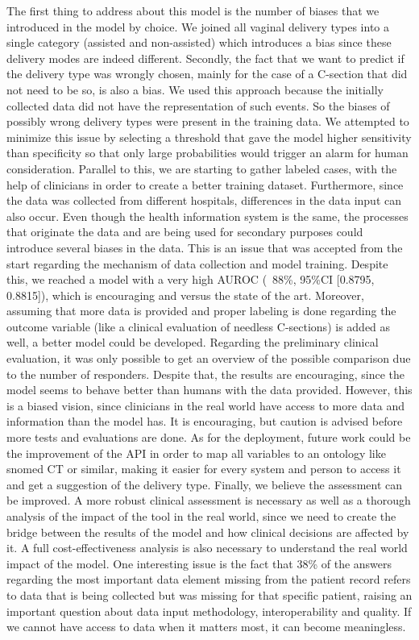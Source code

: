 The first thing to address about this model is the number of biases that we introduced in the model by choice. We joined all vaginal delivery types into a single category (assisted and non-assisted) which introduces a bias since these delivery modes are indeed different. Secondly, the fact that we want to predict if the delivery type was wrongly chosen, mainly for the case of a C-section that did not need to be so, is also a bias. We used this approach because the initially collected data did not have the representation of such events. So the biases of possibly wrong delivery types were present in the training data. We attempted to minimize this issue by selecting a threshold that gave the model higher sensitivity than specificity so that only large probabilities would trigger an alarm for human consideration. Parallel to this, we are starting to gather labeled cases, with the help of clinicians in order to create a better training dataset. Furthermore, since the data was collected from different hospitals, differences in the data input can also occur. Even though the health information system is the same, the processes that originate the data and are being used for secondary purposes could introduce several biases in the data. This is an issue that was accepted from the start regarding the mechanism of data collection and model training. Despite this, we reached a model with a very high AUROC ( 88\%, 95\%CI [0.8795, 0.8815]), which is encouraging and versus the state of the art. Moreover, assuming that more data is provided and proper labeling is done regarding the outcome variable (like a clinical evaluation of needless C-sections) is added as well, a better model could be developed. Regarding the preliminary clinical evaluation, it was only possible to get an overview of the possible comparison due to the number of responders. Despite that, the results are encouraging, since the model seems to behave better than humans with the data provided. However, this is a biased vision, since clinicians in the real world have access to more data and information than the model has. It is encouraging, but caution is advised before more tests and evaluations are done. As for the deployment, future work could be the improvement of the API in order to map all variables to an ontology like snomed CT or similar, making it easier for every system and person to access it and get a suggestion of the delivery type. Finally, we believe the assessment can be improved. A more robust clinical assessment is necessary as well as a thorough analysis of the impact of the tool in the real world, since we need to create the bridge between the results of the model and how clinical decisions are affected by it. A full cost-effectiveness analysis is also necessary to understand the real world impact of the model. One interesting issue is the fact that 38\% of the answers regarding the most important data element missing from the patient record refers to data that is being collected but was missing for that specific patient, raising an important question about data input methodology, interoperability and quality. If we cannot have access to data when it matters most, it can become meaningless.


